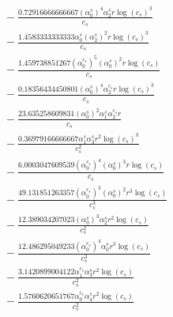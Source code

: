 \documentclass[10pt]{article}
\begin{document}
\begin{align*}
&{}  - \frac{0.72916666666667 \left(\alpha_{0}^s\right)^{4} \alpha_{2}^s r \log{\left(c_{s} \right)}^{3}}{c_{s}} \\
&{}  - \frac{1.4583333333333 \alpha_{0}^s \left(\alpha_{2}^s\right)^{2} r \log{\left(c_{s} \right)}^{3}}{c_{s}} \\
&{}  - \frac{1.459738851267 \left(\alpha_{0}^{c_s}\right)^{5} \left(\alpha_{0}^s\right)^{2} r \log{\left(c_{s} \right)}}{c_{s}} \\
&{}  - \frac{0.18356434450801 \left(\alpha_{0}^s\right)^{4} \alpha_{2}^{c_s} r \log{\left(c_{s} \right)}^{3}}{c_{s}} \\
&{}  - \frac{23.635258609831 \left(\alpha_{0}^s\right)^{2} \alpha_{1}^s \alpha_{2}^{c_s} r}{c_{s}} \\
&{}  - \frac{0.36979166666667 \alpha_{1}^s \alpha_{3}^s r^{2} \log{\left(c_{s} \right)}^{3}}{c_{s}^{2}} \\
&{}  - \frac{6.0003047609539 \left(\alpha_{0}^{c_s}\right)^{4} \left(\alpha_{0}^s\right)^{3} r \log{\left(c_{s} \right)}}{c_{s}} \\
&{}  - \frac{49.131851263357 \left(\alpha_{0}^{c_s}\right)^{3} \left(\alpha_{0}^s\right)^{2} r^{3} \log{\left(c_{s} \right)}}{c_{s}^{3}} \\
&{}  - \frac{12.389034207023 \left(\alpha_{0}^s\right)^{3} \alpha_{2}^s r^{2} \log{\left(c_{s} \right)}}{c_{s}^{2}} \\
&{}  - \frac{12.486295049233 \left(\alpha_{0}^{c_s}\right)^{4} \alpha_{0}^s r^{3} \log{\left(c_{s} \right)}}{c_{s}^{3}} \\
&{}  - \frac{3.1420899004122 \alpha_{1}^{c_s} \alpha_{3}^s r^{2} \log{\left(c_{s} \right)}}{c_{s}^{2}} \\
&{}  - \frac{1.5760620651767 \alpha_{0}^{c_s} \alpha_{4}^s r^{2} \log{\left(c_{s} \right)}}{c_{s}^{2}}
\end{align*}
\end{document}
